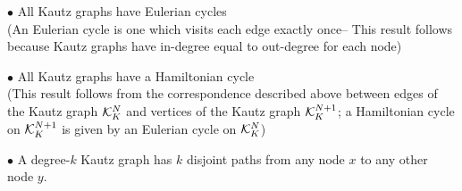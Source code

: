 \documentclass[12pt]{article}
\begin{document}
\noindent $\bullet$ All Kautz graphs have Eulerian cycles\\ (An Eulerian cycle
is one which visits each edge exactly once-- This result follows
because Kautz graphs have in-degree equal to out-degree for each
node)

\noindent $\bullet$ All Kautz graphs have a Hamiltonian cycle\\
(This result follows from the correspondence described above
between edges of    the Kautz graph  ${\cal K}_K^{N}$
and vertices of the Kautz graph
${\cal K}_K^{N + 1}$; a Hamiltonian cycle on ${\cal K}_K^{N + 1}$ is
given by an Eulerian cycle on ${\cal K}_K^{N}$)

\noindent $\bullet$ A degree-$k$ Kautz graph has $k$ disjoint
paths from any node  $x$
to any other node $y$.


\end{document}
